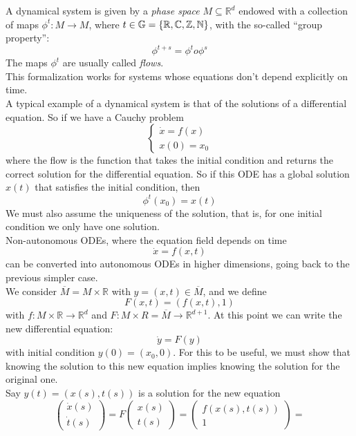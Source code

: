 A dynamical system is given by a \emph{phase space} $M \subseteq \mathbb{R}^d$ endowed with a collection of maps $\phi^t:M\rightarrow M$, where $t \in \mathbb{G} = \left\lbrace \mathbb{R}, \mathbb{C}, \mathbb{Z}, \mathbb{N} \right\rbrace$, with the so-called ``group property'':
$$
	\phi^{t+s} = \phi^t o \phi^s
$$
The maps $\phi^t$ are usually called \emph{flows}. \\ 
This formalization works for systems whose equations don't depend explicitly on time. \\
A typical example of a dynamical system is that of the solutions of a differential equation. So if we have a Cauchy problem
$$
	\begin{cases}
		\dot{x} = f(x) \\
		x\left(0\right) = x_0
	\end{cases}
$$
where the flow is the function that takes the initial condition and returns the correct solution for the differential equation.
So if this ODE has a global solution $x(t)$ that satisfies the initial condition, then 
$$
	\phi^t(x_0) = x(t)
$$
We must also assume the uniqueness of the solution, that is, for one initial condition we only have one solution. \\
Non-autonomous ODEs, where the equation field depends on time
$$
	\dot{x} = f(x,t)
$$
can be converted into autonomous ODEs in higher dimensions, going back to the previous simpler case. \\
We consider $\overline{M} = M \times \mathbb{R}$ with $y = (x,t) \in \overline{M}$, and we define
$$
	F(x,t) = (f(x,t),1)
$$
with $f : M \times \mathbb{R} \rightarrow \mathbb{R}^d$ and $F : M \times R = \overline{M} \rightarrow \mathbb{R}^{d+1}$. At this point we can write the new differential equation:
$$
	\dot{y} = F(y)
$$
with initial condition $y(0) = (x_0,0)$. For this to be useful, we must show that knowing the solution to this new equation implies knowing the solution for the original one. \\
Say $y(t) = (x(s),t(s))$ is a solution for the new equation
$$
	\left(\begin{matrix}
		\dot{x}(s) \\ 
		\dot{t}(s)
	\end{matrix}\right) = 
	F
	\left(\begin{matrix}
		x(s) \\ 
		t(s)
	\end{matrix}\right) =
	\left(\begin{matrix}
		f(x(s),t(s)) \\ 
		1
	\end{matrix}\right) = 
$$
